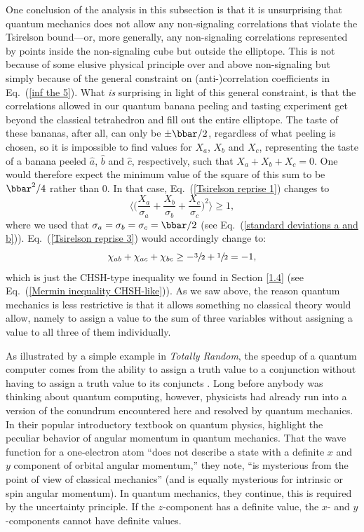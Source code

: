 One conclusion of the analysis in this subsection is that it is unsurprising that quantum mechanics does not allow any non-signaling correlations that violate the Tsirelson bound---or, more generally, any non-signaling correlations represented by points inside the non-signaling cube but outside the elliptope. This is not because of some elusive physical principle over and above non-signaling but simply because of the general constraint on (anti-)correlation coefficients in Eq.\ (\ref{inf the 5}). What \emph{is} surprising in light of this general constraint, is that the correlations allowed in our quantum banana peeling and tasting experiment get beyond the classical tetrahedron and fill out the entire elliptope. The taste of these bananas, after all, can only be $\pm \bbar/2$, regardless of what peeling is chosen, so it is impossible to find values for $X_a$, $X_b$ and $X_c$, representing the taste of a banana peeled $\hat{a}$, $\hat{b}$ and $\hat{c}$, respectively, such that $X_a + X_b + X_c = 0$. One would therefore expect the minimum value of the square of this sum to be $\bbar^2/4$ rather than 0. In that case, Eq.\ (\ref{Tsirelson reprise 1}) changes to
\begin{equation}
\Big\langle \Big(  \frac{X_a}{\sigma_a} +  \frac{X_b}{\sigma_b} + \frac{X_c}{\sigma_c} \Big)^{\!2} \Big\rangle \ge 1,
\label{CHSH reprise 1}
\end{equation} 
where we used that $\sigma_a = \sigma_b = \sigma_c = \bbar/2$ (see Eq.\ (\ref{standard deviations a and b})). Eq.\ (\ref{Tsirelson reprise 3}) would accordingly change to:
\begin{equation}
\chi_{ab} + \chi_{ac}  +  \chi_{bc} \ge - \sfrac32 + \sfrac12 = -1,
\label{CHSH reprise 2}
\end{equation}
which is just the CHSH-type inequality we found in Section \ref{1.4} (see Eq.\ (\ref{Mermin inequality CHSH-like})). As we saw above, the reason quantum mechanics is less restrictive is that it allows something no classical theory would allow, namely to assign a value to the sum of three variables without assigning a value to all three of them individually.

As illustrated by a simple example in \emph{Totally Random}, the speedup of a quantum computer comes from the ability to assign a truth value to a conjunction without having to assign a truth value to its conjuncts \citep[pp.\ 186--215]{Bub and Bub 2018}. Long before anybody was thinking about quantum computing, however, physicists had already run into a version of the conundrum encountered here and resolved by quantum mechanics. In their popular introductory textbook on quantum physics, \citet[p.\ 258]{Eisberg and Resnick 1985} highlight the peculiar behavior of angular momentum in quantum mechanics. That the wave function for a one-electron atom ``does not describe a state with a definite $x$ and $y$ component of orbital angular momentum,'' they note, ``is mysterious from the point of view of classical mechanics'' (and is equally mysterious for intrinsic or spin angular momentum). In quantum mechanics, they continue, this is required by the uncertainty principle. If the $z$-component has a definite value, the $x$- and $y$-components cannot have definite values.
 
